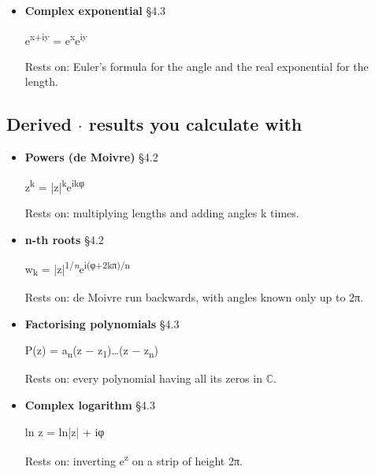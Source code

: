 \documentclass[11pt]{article}
\begin{document}
\begin{keepsection}
\begin{itemize}
z = |z|e\textsuperscript{iφ}

Rests on: length |z| and angle φ, joined by Euler’s formula.
\item {}
\textbf{Complex exponential} \hfill{\small\color{FAUblue}§4.3}

e\textsuperscript{x+iy} = e\textsuperscript{x}e\textsuperscript{iy}

Rests on: Euler’s formula for the angle and the real exponential for the length.
\end{itemize}

\subsection{Derived \ensuremath{\cdot} results you calculate with}

\begin{itemize}
\item {}
\textbf{Powers (de Moivre)} \hfill{\small\color{FAUblue}§4.2}

z\textsuperscript{k} = |z|\textsuperscript{k}e\textsuperscript{ikφ}

Rests on: multiplying lengths and adding angles k times.
\item {}
\textbf{n-th roots} \hfill{\small\color{FAUblue}§4.2}

w\textsubscript{k} = |z|\textsuperscript{1/\textit{n}}e\textsuperscript{i(φ+2kπ)/n}

Rests on: de Moivre run backwards, with angles known only up to 2π.
\item {}
\textbf{Factorising polynomials} \hfill{\small\color{FAUblue}§4.3}

P(z) = a\textsubscript{n}(z \ensuremath{-} z\textsubscript{1})…(z \ensuremath{-} z\textsubscript{n})

Rests on: every polynomial having all its zeros in \ensuremath{\mathbb{C}}.
\item {}
\textbf{Complex logarithm} \hfill{\small\color{FAUblue}§4.3}

ln z = ln|z| + iφ

Rests on: inverting e\textsuperscript{z} on a strip of height 2π.
\end{itemize}


\end{keepsection}
\end{document}

